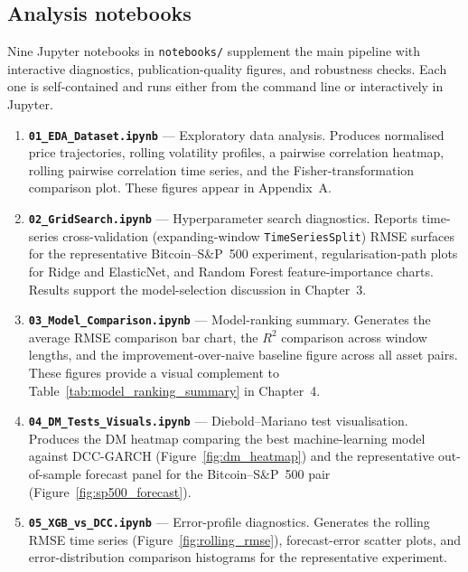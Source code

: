 \subsection{Analysis notebooks}

Nine Jupyter notebooks in \texttt{notebooks/} supplement the main pipeline with interactive diagnostics, publication-quality figures, and robustness checks. Each one is self-contained and runs either from the command line or interactively in Jupyter.

\begin{enumerate}
    \item \textbf{\texttt{01\_EDA\_Dataset.ipynb}} --- Exploratory data analysis. Produces normalised price trajectories, rolling volatility profiles, a pairwise correlation heatmap, rolling pairwise correlation time series, and the Fisher-transformation comparison plot. These figures appear in Appendix~A.

    \item \textbf{\texttt{02\_GridSearch.ipynb}} --- Hyperparameter search diagnostics. Reports time-series cross-validation (expanding-window \texttt{TimeSeriesSplit}) RMSE surfaces for the representative Bitcoin--S\&P~500 experiment, regularisation-path plots for Ridge and ElasticNet, and Random Forest feature-importance charts. Results support the model-selection discussion in Chapter~3.

    \item \textbf{\texttt{03\_Model\_Comparison.ipynb}} --- Model-ranking summary. Generates the average RMSE comparison bar chart, the $R^2$ comparison across window lengths, and the improvement-over-naive baseline figure across all asset pairs. These figures provide a visual complement to Table~\ref{tab:model_ranking_summary} in Chapter~4.

    \item \textbf{\texttt{04\_DM\_Tests\_Visuals.ipynb}} --- Diebold--Mariano test visualisation. Produces the DM heatmap comparing the best machine-learning model against DCC-GARCH (Figure~\ref{fig:dm_heatmap}) and the representative out-of-sample forecast panel for the Bitcoin--S\&P~500 pair (Figure~\ref{fig:sp500_forecast}).

    \item \textbf{\texttt{05\_XGB\_vs\_DCC.ipynb}} --- Error-profile diagnostics. Generates the rolling RMSE time series (Figure~\ref{fig:rolling_rmse}), forecast-error scatter plots, and error-distribution comparison histograms for the representative experiment.


\end{enumerate}
